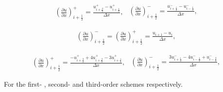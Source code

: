 \documentclass[SingleSpace,12pt]{Serre_ASCE}
\begin{document}
\begin{linenomath*}
\begin{subequations}
\begin{gather}\label{eq:derivdisco1p}
\left(\frac{\partial u}{\partial x}\right)^+_{i + \frac{1}{2}} = \frac{ u^+_{i + \frac{3}{2}} - u^+_{i + \frac{1}{2}}}{\Delta x},
\end{gather}
\begin{gather}\label{eq:derivdisco1m}
\left(\frac{\partial u}{\partial x}\right)^-_{i + \frac{1}{2}} = \frac{ u^-_{i + \frac{1}{2}} - u^-_{i - \frac{1}{2}}}{\Delta x},
\end{gather}
\end{subequations}
\label{eq:derivdisco1}
\end{linenomath*}
\begin{linenomath*}
\begin{gather}\label{eq:derivdisco2}
\left(\frac{\partial u}{\partial x}\right)^-_{i + \frac{1}{2}} = \left(\frac{\partial u}{\partial x}\right)^+_{i + \frac{1}{2}} = \frac{u_{i + 1} - u_{i}}{\Delta x},
\end{gather}
\end{linenomath*}
\begin{linenomath*}
\begin{subequations}
\begin{gather}\label{eq:derivdisco3p}
\left(\frac{\partial u}{\partial x}\right)^+_{i + \frac{1}{2}} = \frac{ -u^+_{i + \frac{3}{2}} + 4u^+_{i + \frac{3}{2}}  -3 u^+_{i + \frac{1}{2}}}{\Delta x},
\end{gather}
\begin{gather}\label{eq:derivdisco3m}
\left(\frac{\partial u}{\partial x}\right)^-_{i + \frac{1}{2}} = \frac{ 3u^-_{i + \frac{1}{2}} - 4u^-_{i - \frac{1}{2}} + u^-_{i - \frac{3}{2}}}{\Delta x},
\end{gather}
\end{subequations}
\label{eq:derivdisco3}
\end{linenomath*}
For the first- , second- and third-order schemes respectively. 
\end{document}
